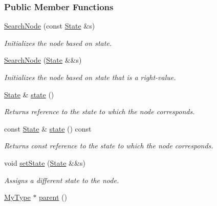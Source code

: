 \subsubsection*{Public Member Functions}
\begin{DoxyCompactItemize}
\item 
\hyperlink{structSearchNode_acc929174122b0da00c0107b458d50515}{Search\+Node} (const \hyperlink{structSearchNode_a2dcd6df22e4aa33cb18ef2fb6bd626c4}{State} \&s)
\begin{DoxyCompactList}\small\item\em Initializes the node based on state. \end{DoxyCompactList}\item 
\hyperlink{structSearchNode_a67e7efa1f1d425338e7bce6b5022f5c8}{Search\+Node} (\hyperlink{structSearchNode_a2dcd6df22e4aa33cb18ef2fb6bd626c4}{State} \&\&s)
\begin{DoxyCompactList}\small\item\em Initializes the node based on state that is a right-\/value. \end{DoxyCompactList}\item 
\hyperlink{structSearchNode_a2dcd6df22e4aa33cb18ef2fb6bd626c4}{State} \& \hyperlink{structSearchNode_a898ee5326ec12b60c03754d2a419ce38}{state} ()
\begin{DoxyCompactList}\small\item\em Returns reference to the state to which the node corresponds. \end{DoxyCompactList}\item 
const \hyperlink{structSearchNode_a2dcd6df22e4aa33cb18ef2fb6bd626c4}{State} \& \hyperlink{structSearchNode_a4aa40778c79f4108f743da6523e7c8c6}{state} () const 
\begin{DoxyCompactList}\small\item\em Returns const reference to the state to which the node corresponds. \end{DoxyCompactList}\item 
void \hyperlink{structSearchNode_ad267fb26699ee6e7855b319b68018b7e}{set\+State} (\hyperlink{structSearchNode_a2dcd6df22e4aa33cb18ef2fb6bd626c4}{State} \&\&s)
\begin{DoxyCompactList}\small\item\em Assigns a different state to the node. \end{DoxyCompactList}\item 
\hyperlink{structSearchNode_ad78b2656f529b6dd04b58957267cfed8}{My\+Type} $\ast$ \hyperlink{structSearchNode_a483e49311935b2a9897715c5bd3f89d7}{parent} ()

\end{DoxyCompactItemize}
